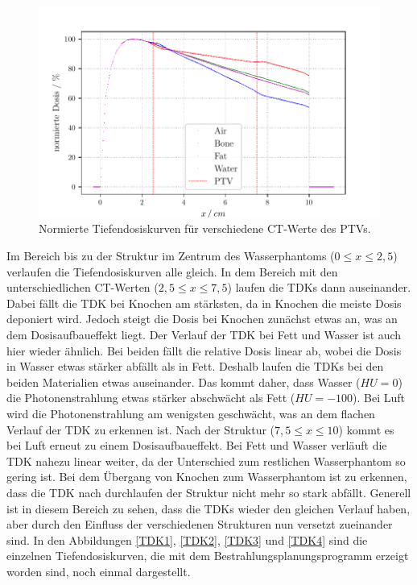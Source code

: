 \begin{figure}[H]
  \centering
  \includegraphics[width=\textwidth]{build/Aufgabe3.2.pdf}
  \caption{Normierte Tiefendosiskurven für verschiedene CT-Werte des PTVs.}
  \label{abb:3.2}
\end{figure}

Im Bereich bis zu der Struktur im Zentrum des Wasserphantoms ($0 \leq x \leq 2,5$) verlaufen
die Tiefendosiskurven alle gleich.
In dem Bereich mit den unterschiedlichen CT-Werten ($2,5 \leq x \leq 7,5$)
laufen die TDKs dann auseinander. Dabei fällt die TDK bei Knochen am stärksten, da in Knochen
die meiste Dosis deponiert wird. Jedoch steigt die Dosis bei Knochen zunächst etwas an, was an dem Dosisaufbaueffekt liegt.
Der Verlauf der TDK bei Fett und Wasser ist auch hier wieder ähnlich. Bei beiden fällt die relative Dosis linear
ab, wobei die Dosis in Wasser etwas stärker abfällt als in Fett. Deshalb laufen die TDKs bei den beiden Materialien etwas auseinander.
Das kommt daher, dass Wasser ($HU = 0$) die Photonenstrahlung etwas stärker abschwächt als Fett ($HU = -100$).
Bei Luft wird die Photonenstrahlung am wenigsten geschwächt, was an dem flachen Verlauf
der TDK zu erkennen ist. Nach der Struktur ($7,5 \leq x \leq 10$) kommt es bei Luft erneut zu
einem Dosisaufbaueffekt. Bei Fett und Wasser verläuft die TDK nahezu linear weiter,
da der Unterschied zum restlichen Wasserphantom so gering ist. Bei dem Übergang von Knochen zum
Wasserphantom ist zu erkennen, dass die TDK nach durchlaufen der Struktur nicht mehr so stark abfällt.
Generell ist in diesem Bereich zu sehen, dass die TDKs wieder den gleichen Verlauf haben, aber durch den Einfluss
der verschiedenen Strukturen nun versetzt zueinander sind.
In den Abbildungen \ref{TDK1}, \ref{TDK2}, \ref{TDK3} und \ref{TDK4} sind die einzelnen Tiefendosiskurven,
die mit dem Bestrahlungsplanungsprogramm erzeigt worden sind, noch einmal dargestellt.


